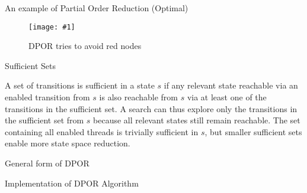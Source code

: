 \documentclass[9pt]{beamer}
\newcommand{\tracelong}[2]{
\begin{figure}[H]
\centering
\texttt{[image: \#1]}
\caption{#2}
\label{#2}
\end{figure}
}
\begin{document}
\begin{frame}{An example of Partial Order Reduction (Optimal)}

\tracelong{../img/partial-order-reduction.pdf}{DPOR tries to avoid red nodes}
    
\end{frame}


\begin{frame}{Sufficient Sets}
\begin{definition} A set of transitions is sufficient in a state $s$ if any relevant state reachable
via an enabled transition from $s$ is also reachable from $s$ via at least one of the transitions in the sufficient set.
A search can thus explore only the transitions in the sufficient set from $s$ because all relevant states still remain
reachable. The set containing all enabled threads is trivially sufficient in $s$, but smaller sufficient sets enable
more state space reduction.
\end{definition}
    
\end{frame}
\begin{frame}{General form of DPOR}
    
\begin{figure}
\centering
{}
\end{figure}

\end{frame}

\begin{frame}{Implementation of DPOR Algorithm}

\begin{figure}
    
\end{figure}

\end{frame}
\end{document}
